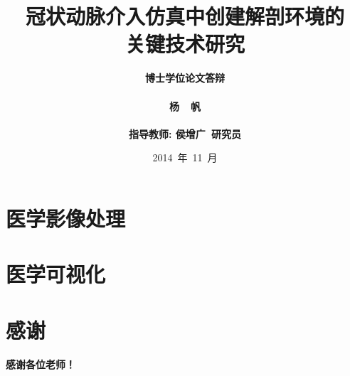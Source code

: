 \documentclass[10pt,compress,hyperref={unicode=true}]{beamer}
\begin{document}
\begin{CJK*}{UTF8}{hei}

\title[冠脉介入仿真中创建解剖环境的\\技术研究]{冠状动脉介入仿真中创建解剖环境的\\关键技术研究}%
\author[杨帆]{
\bf{博士学位论文答辩}\\
\small ~~\\
杨~~帆\\
\small ~~\\
指导教师: 侯增广~研究员\\
}
\date{\scriptsize 2014~年~11~月}


\begin{frame}
\titlepage
\end{frame}

\begin{frame}
\tableofcontents
\end{frame}

%

\section{医学影像处理}




\section{医学可视化}






\section[]{感谢}
\begin{frame}
\centerline{\huge \bf{感谢各位老师！}}
\end{frame}

\end{CJK*}
\end{document}
